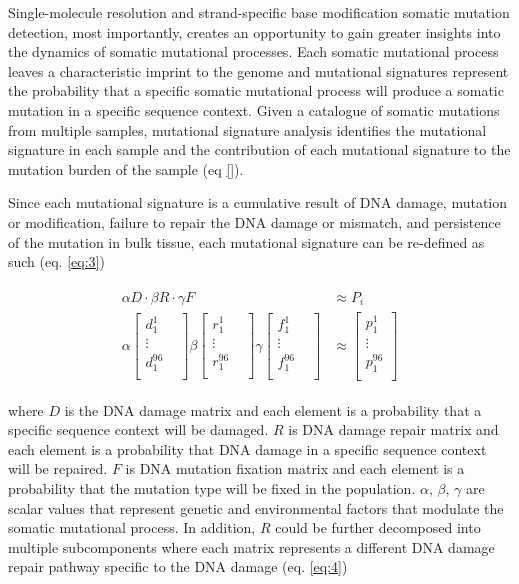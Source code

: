 Single-molecule resolution and strand-specific base modification somatic mutation detection, most importantly, creates an opportunity to gain greater insights into the dynamics of somatic mutational processes. Each somatic mutational process leaves a characteristic imprint to the genome and mutational signatures represent the probability that a specific somatic mutational process will produce a somatic mutation in a specific sequence context. Given a catalogue of somatic mutations from multiple samples, mutational signature analysis identifies the mutational signature in each sample and the contribution of each mutational signature to the mutation burden of the sample (eq \ref{}).

Since each mutational signature is a cumulative result of DNA damage, mutation or modification, failure to repair the DNA damage or mismatch, and persistence of the mutation in bulk tissue, each mutational signature can be re-defined as such (eq. \ref{eq:3})

\begin{align}
\begin{split} 
\alpha D \cdot \beta R \cdot \gamma F &\approx P_{i} \label{eq:3} \\
\alpha \begin{bmatrix}
    d^{1}_{1}  \\
    \vdots &  \\
    d^{96}_{1}  \\
\end{bmatrix} 
\beta \begin{bmatrix}
    r^{1}_{1} \\
    \vdots &  \\
    r^{96}_{1} \\
\end{bmatrix} 
\gamma \begin{bmatrix}
    f^{1}_{1}  \\
    \vdots &  \\
    f^{96}_{1}  \\
\end{bmatrix} &\approx
\begin{bmatrix}
    p^{1}_{1} \\
    \vdots \\
    p^{96}_{1} \\
\end{bmatrix}
\end{split}
\end{align}

where $D$ is the DNA damage matrix and each element is a probability that a specific sequence context will be damaged. $R$ is DNA damage repair matrix and each element is a probability that DNA damage in a specific sequence context will be repaired. $F$ is DNA mutation fixation matrix and each element is a probability that the mutation type will be fixed in the population. $\alpha$, $\beta$, $\gamma$ are scalar values that represent genetic and environmental factors that modulate the somatic mutational process. In addition, $R$ could be further decomposed into multiple subcomponents where each matrix represents a different DNA damage repair pathway specific to the DNA damage (eq. \ref{eq:4})

